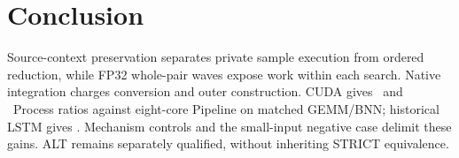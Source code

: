 \section{Conclusion}
Source-context preservation separates private sample execution from ordered reduction, while FP32 whole-pair waves expose work within each search. Native integration charges conversion and outer construction. CUDA gives \GemmNewPipeProc\ and \BnnNewPipeProc\ Process ratios against eight-core Pipeline on matched GEMM/BNN; historical LSTM gives \LstmPipeProc. Mechanism controls and the small-input negative case delimit these gains. ALT remains separately qualified, without inheriting STRICT equivalence.
